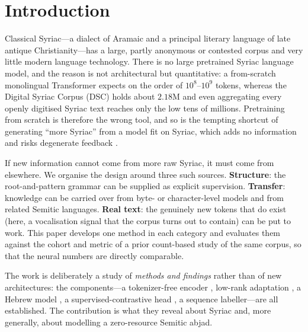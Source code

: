 \documentclass[11pt]{article}
\begin{document}
\section{Introduction}
\label{sec:intro}

Classical Syriac---a dialect of Aramaic and a principal literary language of late
antique Christianity---has a large, partly anonymous or contested corpus and very
little modern language technology. There is no large pretrained Syriac language
model, and the reason is not architectural but quantitative: a from-scratch
monolingual Transformer expects on the order of $10^{8}$--$10^{9}$ tokens, whereas
the Digital Syriac Corpus (DSC) holds about $2.18$M and even aggregating every
openly digitised Syriac text reaches only the low tens of millions. Pretraining
from scratch is therefore the wrong tool, and so is the tempting shortcut of
generating ``more Syriac'' from a model fit on Syriac, which adds no information
and risks degenerate feedback \citep{shumailov2024collapse}.

If new information cannot come from more raw Syriac, it must come from elsewhere.
We organise the design around three such sources. \textbf{Structure}: the
root-and-pattern grammar can be supplied as explicit supervision. \textbf{Transfer}:
knowledge can be carried over from byte- or character-level models and from related
Semitic languages. \textbf{Real text}: the genuinely new tokens that do exist
(here, a vocalisation signal that the corpus turns out to contain) can be put to
work. This paper develops one method in each category and evaluates them against
the cohort and metric of a prior count-based study of the same corpus, so that the
neural numbers are directly comparable.

The work is deliberately a study of \emph{methods and findings} rather than of new
architectures: the components---a tokenizer-free encoder \citep{clark2022canine},
low-rank adaptation \citep{hu2022lora}, a Hebrew model \citep{seker2022alephbert},
a supervised-contrastive head \citep{khosla2020supcon}, a sequence labeller---are
all established. The contribution is what they reveal about Syriac and, more
generally, about modelling a zero-resource Semitic abjad.
\end{document}
